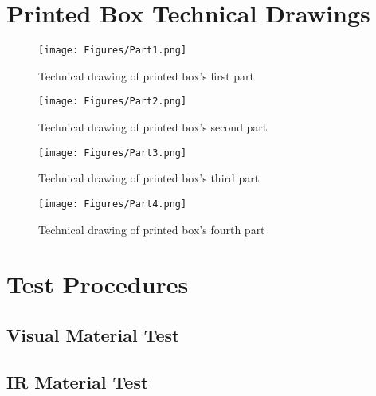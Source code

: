 
\setcounter{page}{1}
\chapter{Printed Box Technical Drawings}
\label{annex:drawings}
\begin{figure}[!htb]
  \centering
  \texttt{[image: Figures/Part1.png]}
  \caption[Technical Drawing of Printed Box's First Part]{Technical drawing of printed box's first part}
\end{figure}
\begin{figure}[!htb]
  \centering
  \texttt{[image: Figures/Part2.png]}
  \caption[Technical Drawing of Printed Box's Second Part]{Technical drawing of printed box's second part}
\end{figure}
\begin{figure}[!htb]
  \centering
  \texttt{[image: Figures/Part3.png]}
  \caption[Technical Drawing of Printed Box's Third Part]{Technical drawing of printed box's third part}
\end{figure}
\begin{figure}[!htb]
  \centering
  \texttt{[image: Figures/Part4.png]}
  \caption[Technical Drawing of Printed Box's Fourth Part]{Technical drawing of printed box's fourth part}
\end{figure}
\chapter{Test Procedures}
\section{Visual Material Test}
\label{visualmaterial}


\section{IR Material Test}
\label{annex:irmaterial}


